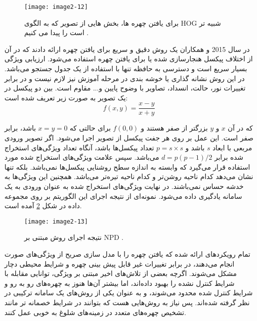 \begin{figure}
	\centering
	\texttt{[image: image2-12]}
	\caption{براى يافتن چهره ها، بخش هايى از تصوير كه به الگوى HOG شبيه تر است را پيدا می كنيم \cite{1467360}.}
	\label{image2-12}
\end{figure}

\noindent
در سال 2015  و همکاران \cite{7130626} یک روش دقیق و سریع برای یافتن چهره ارائه دادند که در آن از اختلاف پیکسل هنجارسازی شده یا   برای یافتن چهره استفاده می‌شود. ارزیابی ویژگی  بسیار سریع است و دسترسی به حافظه تنها با استفاده از یک جدول جستجو می‌باشد. در این روش نشانه گذاری یا خوشه بندی در مرحله آموزش نیز لازم نیست و در برابر تغییرات نور، حالت، انسداد، تصاویر با وضوح پایین و... مقاوم است.  بین دو پیکسل در یک تصویر به صورت زیر تعریف شده است:
\begin{equation}\label{eq2-6}
f(x, y) = \frac{x - y}{x + y}
\end{equation}

\noindent
که در آن $x$ و $y$ بزرگتر از صفر هستند و $f(0,0)$ برای حالتی که $x = y = 0$ باشد، برابر صفر است. این عمل بر روی هر جفت پیکسل از تصویر اجرا می‌شود. اگر تصویر ورودی مربعی با ابعاد $s$ باشد و $p=s \times s$ تعداد پیکسل‌ها باشد، آنگاه تعداد ویژگی‌های استخراج شده برابر $d=p(p-1)/2$ می‌باشد. سپس علامت  ویژگی‌های استخراج شده مورد استفاده قرار می‌گیرد که وابسته به اندازه سطح روشنایی پیکسل‌ها نمی‌باشد. بلکه تنها نشان می‌دهد کدام ناحیه روشن‌تر و کدام ناحیه تیره‌تر می‌باشد. همچنین این ویژگی‌ها به خدشه  حساس نمی‌باشند. در نهایت ویژگی‌های استخراج شده به عنوان ورودی به یک سامانه یادگیری داده می‌شود. نمونه‌ای از نتیجه اجرای این الگوریتم بر روی مجموعه داده  در شکل \ref{image2-13} آمده است.
 
 \begin{figure}[h]
\centering
  \texttt{[image: image2-13]}
  \caption{نتیجه اجرای روش مبتنی بر NPD \cite{7130626}.}
  \label{image2-13}
\end{figure}

\noindent
تمام رویکرد‌های ارائه شده که یافتن چهره را با مدل سازی صریح از ویژگی‌های صورت انجام می‌دهند، در برابر تغییرات غیر قابل پیش بینی چهره و شرایط محیطی دچار مشکل می‌شوند. اگرچه بعضی از تلاش‌های اخیر مبتنی بر ویژگی، توانایی مقابله با شرایط کنترل نشده را بهبود داده‌اند، اما بیشتر آن‌ها هنوز به چهره‌های رو به رو و شرایط کنترل شده محدود می‌شوند، و به عنوان یکی از روش‌های یک سامانه ترکیبی در نظر گرفته شده‌اند. پس نیاز به روش‌هایی هست که بتوانند در شرایط خصمانه تر مانند تشخیص چهره‌های متعدد در زمینه‌های شلوغ به خوبی عمل کنند.

